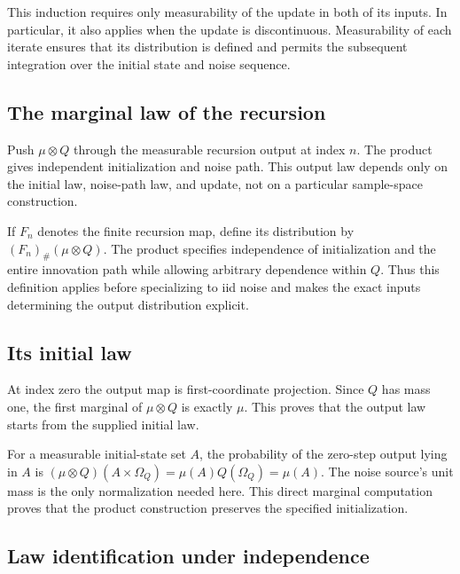 \documentclass[11pt,a4paper]{report}
\begin{document}
This induction requires only measurability of the update in both of its inputs. In particular, it also applies when the update is discontinuous. Measurability of each iterate ensures that its distribution is defined and permits the subsequent integration over the initial state and noise sequence.

\subsection{\texorpdfstring{The marginal law of the recursion}{The marginal law of the recursion}}
\label{report-step-UnadjustedLangevin-ChainLaw-lean-5}


Push \(\mu\otimes Q\) through the measurable recursion output at index \(n\). The product gives independent initialization and noise path. This output law depends only on the initial law, noise-path law, and update, not on a particular sample-space construction.



If \(F_n\) denotes the finite recursion map, define its distribution by \((F_n)_\#(\mu\otimes Q)\). The product specifies independence of initialization and the entire innovation path while allowing arbitrary dependence within \(Q\). Thus this definition applies before specializing to iid noise and makes the exact inputs determining the output distribution explicit.

\subsection{\texorpdfstring{Its initial law}{Its initial law}}
\label{report-step-UnadjustedLangevin-ChainLaw-lean-6}


At index zero the output map is first-coordinate projection. Since \(Q\) has mass one, the first marginal of \(\mu\otimes Q\) is exactly \(\mu\). This proves that the output law starts from the supplied initial law.



For a measurable initial-state set \(A\), the probability of the zero-step output lying in \(A\) is \((\mu\otimes Q)(A\times\Omega_Q)=\mu(A)Q(\Omega_Q)=\mu(A)\). The noise source's unit mass is the only normalization needed here. This direct marginal computation proves that the product construction preserves the specified initialization.

\subsection{\texorpdfstring{Law identification under independence}{Law identification under independence}}
\label{report-step-UnadjustedLangevin-ChainLaw-lean-7}
\end{document}
